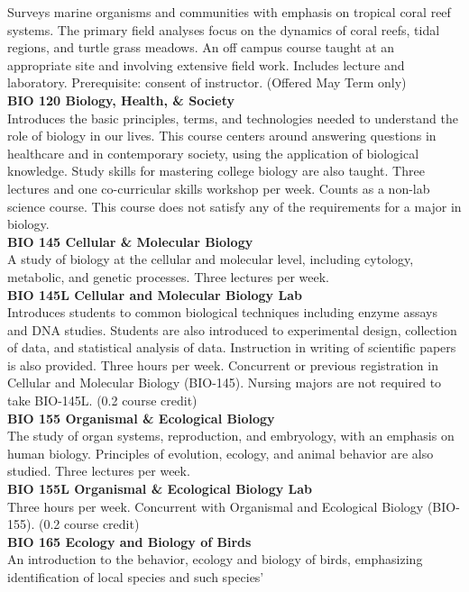 \documentclass[
  letterpaper,
]{scrbook}
\begin{document}
Surveys marine organisms and communities with emphasis on tropical coral
reef systems. The primary field analyses focus on the dynamics of coral
reefs, tidal regions, and turtle grass meadows. An off campus course
taught at an appropriate site and involving extensive field work.
Includes lecture and laboratory. Prerequisite: consent of instructor.
(Offered May Term only)\\
\textbf{BIO 120 Biology, Health, \& Society}\\
Introduces the basic principles, terms, and technologies needed to
understand the role of biology in our lives. This course centers around
answering questions in healthcare and in contemporary society, using the
application of biological knowledge. Study skills for mastering college
biology are also taught. Three lectures and one co-curricular skills
workshop per week. Counts as a non-lab science course. This course does
not satisfy any of the requirements for a major in biology.\\
\textbf{BIO 145 Cellular \& Molecular Biology}\\
A study of biology at the cellular and molecular level, including
cytology, metabolic, and genetic processes. Three lectures per week.\\
\textbf{BIO 145L Cellular and Molecular Biology Lab}\\
Introduces students to common biological techniques including enzyme
assays and DNA studies. Students are also introduced to experimental
design, collection of data, and statistical analysis of data.
Instruction in writing of scientific papers is also provided. Three
hours per week. Concurrent or previous registration in Cellular and
Molecular Biology (BIO-145). Nursing majors are not required to take
BIO-145L. (0.2 course credit)\\
\textbf{BIO 155 Organismal \& Ecological Biology}\\
The study of organ systems, reproduction, and embryology, with an
emphasis on human biology. Principles of evolution, ecology, and animal
behavior are also studied. Three lectures per week.\\
\textbf{BIO 155L Organismal \& Ecological Biology Lab}\\
Three hours per week. Concurrent with Organismal and Ecological Biology
(BIO-155). (0.2 course credit)\\
\textbf{BIO 165 Ecology and Biology of Birds}\\
An introduction to the behavior, ecology and biology of birds,
emphasizing identification of local species and such species'
\end{document}

